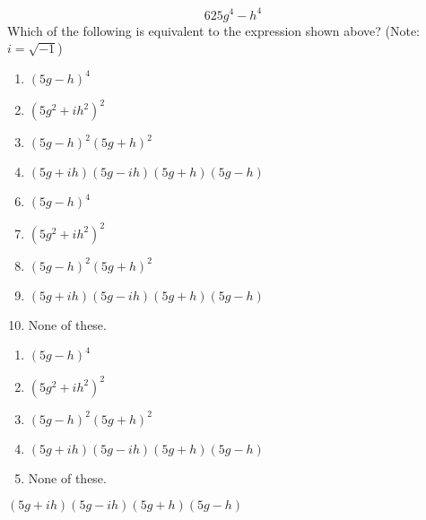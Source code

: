  
$$625g^4-h^4 $$
Which of the following is equivalent to the expression shown above?  (Note: $i=\sqrt{-1}$)


\ifsat
	\begin{enumerate}[label=\Alph*)]
		\item $(5g-h)^4 $ 
		\item $(5g^2+ih^2)^2 $ 
		\item $(5g-h)^2(5g+h)^2 $ 
		\item $(5g+ih)(5g-ih)(5g+h)(5g-h) $ %
	\end{enumerate}
\else
\fi

\ifacteven
	\begin{enumerate}[label=\textbf{\Alph*.},itemsep=\fill,align=left]
		\setcounter{enumii}{5}
		\item $(5g-h)^4 $ 
		\item $(5g^2+ih^2)^2 $ 
		\item $(5g-h)^2(5g+h)^2 $ 
		\addtocounter{enumii}{1}
		\item $(5g+ih)(5g-ih)(5g+h)(5g-h) $ %
		\item None of these. 
	\end{enumerate}
\else
\fi

\ifactodd
	\begin{enumerate}[label=\textbf{\Alph*.},itemsep=\fill,align=left]
		\item $(5g-h)^4 $ 
		\item $(5g^2+ih^2)^2 $ 
		\item $(5g-h)^2(5g+h)^2 $ 
		\item $(5g+ih)(5g-ih)(5g+h)(5g-h) $ %
		\item None of these. 
	\end{enumerate}
\else
\fi

\ifgridin
 $(5g+ih)(5g-ih)(5g+h)(5g-h) $ %

\else
\fi

